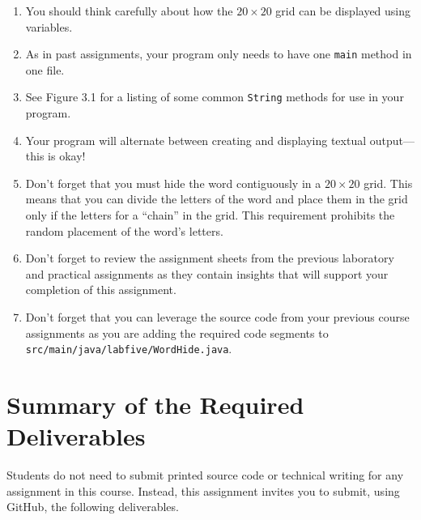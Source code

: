 \documentclass[11pt]{article}
\newcommand{\mainprogramsource}{\lstinline{src/main/java/labfive/WordHide.java}}
\newcommand{\program}[1]{\lstinline{#1}}
\begin{document}
\vspace*{-.05in}

\begin{enumerate}
  \setlength{\itemsep}{0pt}

\item You should think carefully about how the $20 \times 20$ grid can be
  displayed using variables.

\item As in past assignments, your program only needs to have one {\tt main}
  method in one file.

\item See Figure 3.1 for a listing of some common \program{String} methods for
  use in your program.

\item Your program will alternate between creating and displaying textual
  output---this is okay!

\item Don't forget that you must hide the word contiguously in a $20 \times 20$
  grid. This means that you can divide the letters of the word and place them in
  the grid only if the letters for a ``chain'' in the grid. This requirement
  prohibits the random placement of the word's letters.

\item Don't forget to review the assignment sheets from the previous laboratory
  and practical assignments as they contain insights that will support your
  completion of this assignment.

\item Don't forget that you can leverage the source code from your previous
  course assignments as you are adding the required code segments to
  \mainprogramsource{}.

\end{enumerate}
\vspace*{-.15in}

\section*{Summary of the Required Deliverables}

\noindent Students do not need to submit printed source code or technical
writing for any assignment in this course. Instead, this assignment invites you
to submit, using GitHub, the following deliverables.
\end{document}
